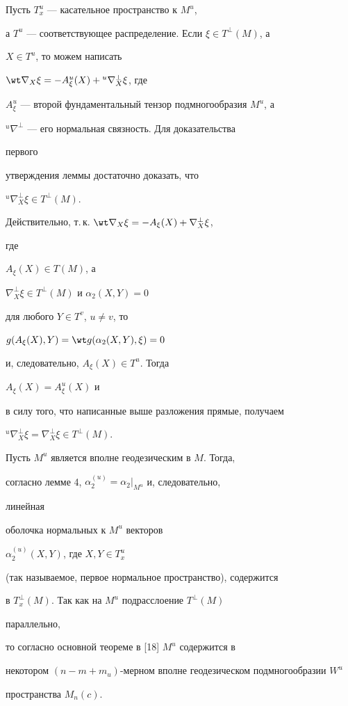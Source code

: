 \begin{pf} Пусть $T^u_x$ --- касательное пространство к $M^u$,


а $T^u$ --- соответствующее распределение. Если $\xi\in T^\bot(M)$, а


$X\in T^u$, то можем написать


$\wt\nabla_X\xi=-A^u_\xi(X)+{}^u\nabla^\bot_X\xi$, где


$A^u_\xi$ --- второй фундаментальный тензор подмногообразия $M^u$, а


${}^u\nabla^\bot$ --- его нормальная связность. Для доказательства


первого


утверждения леммы достаточно доказать, что


${}^u\nabla^\bot_X\xi\in T^\bot(M)$.


Действительно, т.\,к. $\wt\nabla_X\xi=-A_\xi(X)+\nabla^\bot_X\xi$,


где


$A_\xi(X)\in T(M)$, а


$\nabla^\bot_X\xi\in T^\bot(M)$ и $\alpha_2(X,Y)=0$


для любого $Y\in T^v$, $u\ne v$, то


$g(A_\xi(X),Y)=\wt g(\alpha_2(X,Y),\xi)=0$


и, следовательно, $A_\xi(X)\in T^u$. Тогда


$A_\xi(X)=A^u_\xi(X)$ и


в силу того, что написанные выше разложения прямые, получаем


${}^u\nabla^\bot_X\xi=\nabla^\bot_X\xi\in T^\bot (M)$.





Пусть $M^u$ является вполне геодезическим в $M$. Тогда,


согласно лемме 4, $\alpha^{(u)}_2=\alpha_2|_{M^u}$ и, следовательно,


линейная


оболочка нормальных к $M^u$ векторов


$\alpha^{(u)}_2(X,Y)$, где $X,Y\in T^u_x$


(так называемое, первое нормальное пространство), содержится


в $T^\bot_x(M)$. Так как на $M^u$ подрасслоение $T^\bot(M)$


параллельно,


то согласно основной теореме в [18] $M^u$ содержится в


некотором $(n-m+m_u)$-мерном вполне геодезическом подмногообразии $W^u$


пространства $M_n(c)$.


\end{pf}





